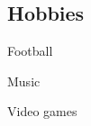 \documentclass[../main.tex]{subfiles}
\begin{document}
\begin{category}
\section{Hobbies}
    \begin{enumerate*}[label=$\diamond$]
        \item Football \qquad \qquad
        \item Music \qquad \qquad
        \item Video games \qquad \qquad
    \end{enumerate*}
\end{category}
\end{document}
